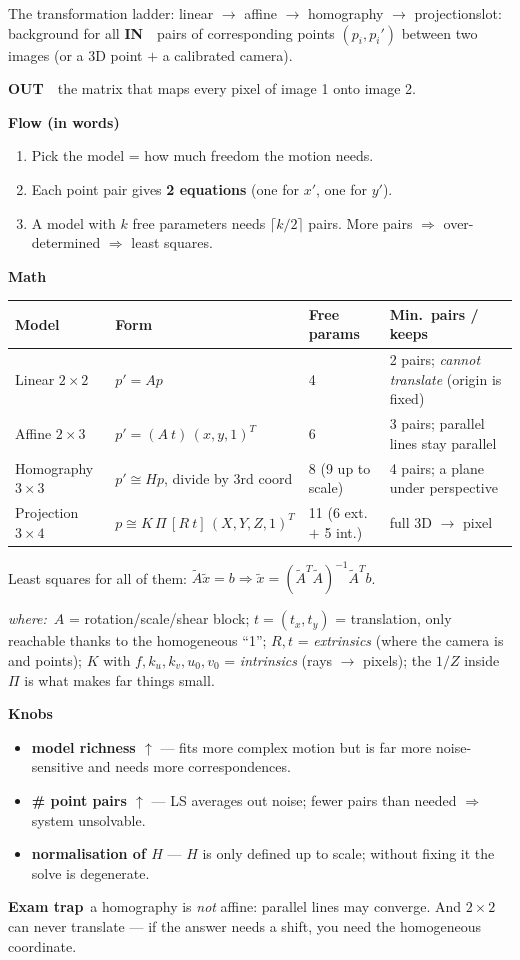 \documentclass[9pt,a4paper]{extarticle}
\newcommand{\IN}{\textbf{\color{cIn}IN}\ }
\newcommand{\OUT}{\par\textbf{\color{cOut}OUT}\ }
\newcommand{\FLOW}{\par\smallskip\textbf{Flow (in words)}\par\nopagebreak}
\newcommand{\MATH}{\par\smallskip\textbf{Math}\par\nopagebreak}
\newcommand{\KNOBS}{\par\smallskip\textbf{Knobs}\par\nopagebreak}
\newcommand{\TRAP}{\par\smallskip\textbf{\color{cTrap}Exam trap}\ }
\newcommand{\WHERE}{\par\textit{where:}\ }
\newcommand{\up}{$\uparrow$}
\newcommand{\kn}[2]{\item \textbf{#1} --- #2}
\begin{document}
\begin{card}{The transformation ladder: linear $\to$ affine $\to$ homography $\to$ projection}{slot: background for all}
\IN\ pairs of corresponding points $(p_i,p_i')$ between two images (or a 3D point $+$ a calibrated camera).
\OUT\ the matrix that maps every pixel of image 1 onto image 2.

\FLOW
\begin{enumerate}
  \item Pick the model = how much freedom the motion needs.
  \item Each point pair gives \textbf{2 equations} (one for $x'$, one for $y'$).
  \item A model with $k$ free parameters needs $\lceil k/2\rceil$ pairs. More pairs $\Rightarrow$ over-determined $\Rightarrow$ least squares.
\end{enumerate}

\MATH
\begin{center}\footnotesize
\begin{tabular}{@{}llll@{}}
\textbf{Model} & \textbf{Form} & \textbf{Free params} & \textbf{Min.\ pairs / keeps}\\ \midrule
Linear $2\times2$ & $p'=Ap$ & 4 & 2 pairs; \emph{cannot translate} (origin is fixed)\\
Affine $2\times3$ & $p'=(A\ t)\,(x,y,1)^T$ & 6 & 3 pairs; parallel lines stay parallel\\
Homography $3\times3$ & $p'\cong Hp$, divide by 3rd coord & 8 (9 up to scale) & 4 pairs; a plane under perspective\\
Projection $3\times4$ & $p\cong K\,\Pi\,[R\ t]\,(X,Y,Z,1)^T$ & 11 (6 ext.\ $+$ 5 int.) & full 3D $\to$ pixel\\
\end{tabular}
\end{center}
Least squares for all of them: $\tilde A\tilde x=b\Rightarrow \tilde x=(\tilde A^T\tilde A)^{-1}\tilde A^Tb$.
\WHERE $A$ = rotation/scale/shear block; $t=(t_x,t_y)$ = translation, only reachable thanks to the homogeneous ``1''; $R,t$ = \emph{extrinsics} (where the camera is and points); $K$ with $f,k_u,k_v,u_0,v_0$ = \emph{intrinsics} (rays $\to$ pixels); the $1/Z$ inside $\Pi$ is what makes far things small.

\KNOBS
\begin{itemize}
  \kn{model richness \up}{fits more complex motion but is far more noise-sensitive and needs more correspondences.}
  \kn{\# point pairs \up}{LS averages out noise; fewer pairs than needed $\Rightarrow$ system unsolvable.}
  \kn{normalisation of $H$}{$H$ is only defined up to scale; without fixing it the solve is degenerate.}
\end{itemize}
\TRAP a homography is \emph{not} affine: parallel lines may converge. And $2\times2$ can never translate --- if the answer needs a shift, you need the homogeneous coordinate.
\end{card}
\end{document}
